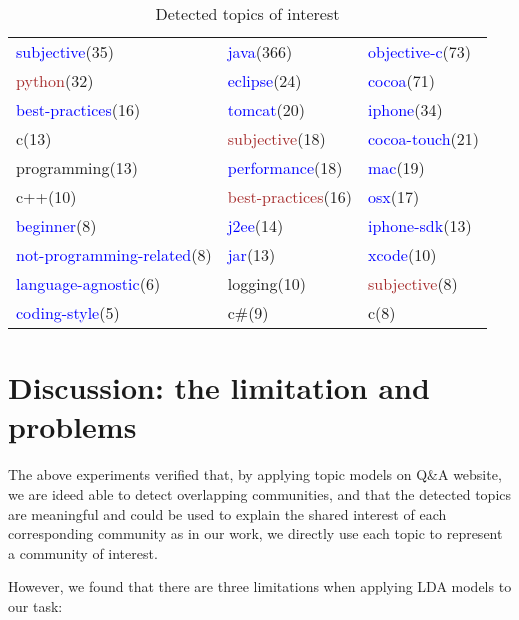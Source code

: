 \begin{sidewaystable}
\begin{tabular}{l|l|l}
\hline
\textcolor{blue}{subjective}(35)&\textcolor{blue}{java}(366)&\textcolor{blue}{objective-c}(73)\\
\textcolor{brown}{python}(32)&\textcolor{blue}{eclipse}(24)&\textcolor{blue}{cocoa}(71)\\
\textcolor{blue}{best-practices}(16)&\textcolor{blue}{tomcat}(20)&\textcolor{blue}{iphone}(34)\\
c(13)&\textcolor{brown}{subjective}(18)&\textcolor{blue}{cocoa-touch}(21)\\
programming(13)&\textcolor{blue}{performance}(18)&\textcolor{blue}{mac}(19)\\
c++(10)&\textcolor{brown}{best-practices}(16)&\textcolor{blue}{osx}(17)\\
\textcolor{blue}{beginner}(8)&\textcolor{blue}{j2ee}(14)&\textcolor{blue}{iphone-sdk}(13)\\
\textcolor{blue}{not-programming-related}(8)&\textcolor{blue}{jar}(13)&\textcolor{blue}{xcode}(10)\\
\textcolor{blue}{language-agnostic}(6)&logging(10)&\textcolor{brown}{subjective}(8)\\
\textcolor{blue}{coding-style}(5)&c\#(9)&c(8)\\
\hline
\end{tabular}
\caption{Detected topics of interest}
\label{tab:ldaresult2}
\end{sidewaystable}

\section{Discussion: the limitation and problems}
The above experiments verified that, by applying topic models on Q\&A website, we are ideed able to detect overlapping communities, and that the detected topics are meaningful and could be used to explain the shared interest of each corresponding community as in our work, we directly use each topic to represent a community of interest.

However, we found that there are three limitations when applying LDA models to our task:

